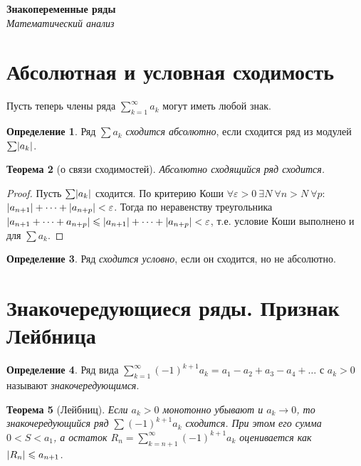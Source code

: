 \documentclass[11pt,a4paper]{article}
\newcommand{\coursename}{Математический анализ}
\newcommand{\doctitle}{Знакопеременные ряды}
\theoremstyle{definition}
\newtheorem{definition}{Определение}[section]
\theoremstyle{plain}
\newtheorem{theorem}[definition]{Теорема}
\newcommand{\eps}{\varepsilon}
\renewcommand{\le}{\leqslant}
\DeclarePairedDelimiter{\abs}{\lvert}{\rvert}
\begin{document}
\begin{center}
  {\LARGE\bfseries \doctitle}\\[4pt]
  {\large\itshape \coursename}
\end{center}
\vspace{6pt}

\section{Абсолютная и условная сходимость}

Пусть теперь члены ряда $\displaystyle\sum_{k=1}^\infty a_k$ могут иметь любой знак.

\begin{definition}
Ряд $\sum a_k$ \emph{сходится абсолютно}, если сходится ряд из модулей $\sum\abs{a_k}$.
\end{definition}

\begin{theorem}[о связи сходимостей]
Абсолютно сходящийся ряд сходится.
\end{theorem}

\begin{proof}
Пусть $\sum\abs{a_k}$ сходится. По критерию Коши $\forall\eps>0\ \exists N\ \forall n>N\ \forall
p$: $\abs{a_{n+1}}+\dots+\abs{a_{n+p}}<\eps$. Тогда по неравенству треугольника
$\abs{a_{n+1}+\dots+a_{n+p}}\le\abs{a_{n+1}}+\dots+\abs{a_{n+p}}<\eps$, т.е. условие Коши
выполнено и для $\sum a_k$.
\end{proof}

\begin{definition}
Ряд \emph{сходится условно}, если он сходится, но не абсолютно.
\end{definition}

\section{Знакочередующиеся ряды. Признак Лейбница}

\begin{definition}
Ряд вида $\displaystyle\sum_{k=1}^\infty(-1)^{k+1}a_k=a_1-a_2+a_3-a_4+\dots$ с $a_k>0$ называют
\emph{знакочередующимся}.
\end{definition}

\begin{theorem}[Лейбниц]
Если $a_k>0$ монотонно убывают и $a_k\to0$, то знакочередующийся ряд
$\sum(-1)^{k+1}a_k$ сходится. При этом его сумма $0<S<a_1$, а остаток
$\displaystyle R_n=\sum_{k=n+1}^\infty(-1)^{k+1}a_k$ оценивается как $\abs{R_n}\le a_{n+1}$.
\end{theorem}
\end{document}
